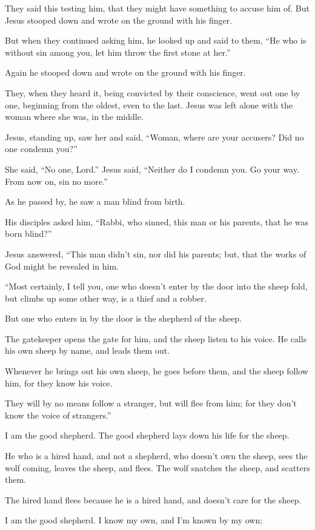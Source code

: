 They said this testing him, that they might have something to accuse him of. But Jesus stooped down and wrote on the ground with his finger.

But when they continued asking him, he looked up and said to them, “He who is without sin among you, let him throw the first stone at her.”

Again he stooped down and wrote on the ground with his finger.

They, when they heard it, being convicted by their conscience, went out one by one, beginning from the oldest, even to the last. Jesus was left alone with the woman where she was, in the middle.

Jesus, standing up, saw her and said, “Woman, where are your accusers? Did no one condemn you?”

She said, “No one, Lord.” Jesus said, “Neither do I condemn you. Go your way. From now on, sin no more.”

As he passed by, he saw a man blind from birth.

His disciples asked him, “Rabbi, who sinned, this man or his parents, that he was born blind?”

Jesus answered, “This man didn’t sin, nor did his parents; but, that the works of God might be revealed in him.

“Most certainly, I tell you, one who doesn’t enter by the door into the sheep fold, but climbs up some other way, is a thief and a robber.

But one who enters in by the door is the shepherd of the sheep.

The gatekeeper opens the gate for him, and the sheep listen to his voice. He calls his own sheep by name, and leads them out.

Whenever he brings out his own sheep, he goes before them, and the sheep follow him, for they know his voice.

They will by no means follow a stranger, but will flee from him; for they don’t know the voice of strangers.”

I am the good shepherd. The good shepherd lays down his life for the sheep.

He who is a hired hand, and not a shepherd, who doesn’t own the sheep, sees the wolf coming, leaves the sheep, and flees. The wolf snatches the sheep, and scatters them.

The hired hand flees because he is a hired hand, and doesn’t care for the sheep.

I am the good shepherd. I know my own, and I’m known by my own;



